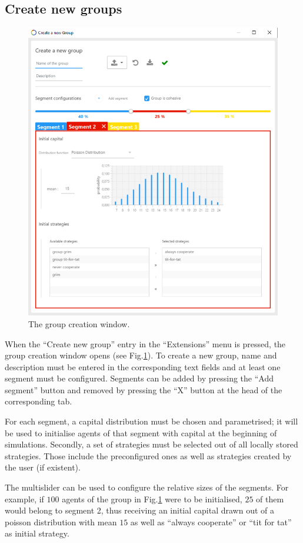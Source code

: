 \documentclass[parskip=full,11pt]{scrartcl}
\begin{document}
\subsection{Create new groups}
\begin{figure}
	\centering
	\includegraphics[width=0.8\linewidth]{img_manual/group_window.png}
	\caption{The group creation window.}
	\label{fig:group_window}
\end{figure}
When the \enquote{Create new group} entry in the \enquote{Extensions} menu is pressed, the group creation window opens (see Fig.\ref{fig:group_window}). To create a new group, name and description must be entered in the corresponding text fields and at least one segment must be configured. Segments can be added by pressing the \enquote{Add segment} button and removed by pressing the \enquote{X} button at the head of the corresponding tab.

For each segment, a capital distribution must be chosen and parametrised; it will be used to initialise agents of that segment with capital at the beginning of simulations. Secondly, a set of strategies must be selected out of all locally stored strategies. Those include the preconfigured ones as well as strategies created by the user (if existent).

The multislider can be used to configure the relative sizes of the segments. For example, if \(100\) agents of the group in Fig.\ref{fig:group_window} were to be initialised, \(25\) of them would belong to segment 2, thus receiving an initial capital drawn out of a poisson distribution with mean \(15\) as well as \enquote{always cooperate} or \enquote{tit for tat} as initial strategy.
\end{document}

